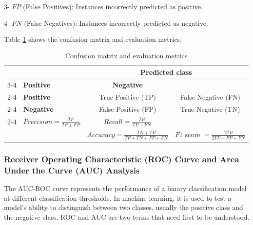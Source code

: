 \documentclass{article}
\begin{document}
3- $FP$ (False Positives): Instances incorrectly predicted as positive.

4- $FN$ (False Negatives): Instances incorrectly predicted as negative.

Table \ref{table3} shows the confusion matrix and evaluation metrics.









\begin{table}[H]
\centering
\caption{Confusion matrix and evaluation metrics}
\renewcommand{\arraystretch}{2}
\begin{tabular}{l|l|c|c|}
\multicolumn{2}{c}{} & \multicolumn{2}{c}{\textbf{Predicted class}} \\
\cline{3-4}
\multicolumn{2}{c|}{} & \cellcolor{purple!25} \textbf{Positive} & \cellcolor{red!25} \textbf{Negative} \\
\cline{2-4}
\multirow{2}{*}{\textbf{Actual class}} & \cellcolor{purple!25} \textbf{Positive} & \cellcolor{cyan!25} True Positive (TP) & \cellcolor{cyan!25} False Negative (FN) \\
\cline{2-4}
& \cellcolor{red!25} \textbf{Negative} & \cellcolor{gray!25} False Positive (FP) & \cellcolor{gray!25} True Negative (TN) \\
\cline{2-4}
\multicolumn{2}{c|}{} & \cellcolor{green!40} $ Precision = \frac{TP}{TP + FP}$ & \cellcolor{orange!40} $ Recall = \frac{TP}{TP + FN}$ \\
\multicolumn{2}{c|}{} & \cellcolor{yellow!40} $ Accuracy = \frac{TN + TP}{TP + TN + FP + FN}$ & \cellcolor{pink!40} $ F1$ score $= \frac{2  TP}{2 TP + FP + FN}$ \\
\end{tabular}
\label{table3}
\end{table}






\subsubsection{Receiver Operating Characteristic (ROC) Curve and Area Under the Curve (AUC) Analysis}


The AUC-ROC curve represents the performance of a binary classification model at different classification thresholds. In machine learning, it is used to test a model's ability to distinguish between two classes, usually the positive class  and the negative class. ROC and AUC are two terms that need first to be understood.
\end{document}
